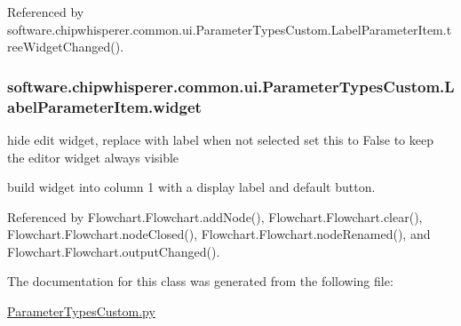 Referenced by software.\+chipwhisperer.\+common.\+ui.\+Parameter\+Types\+Custom.\+Label\+Parameter\+Item.\+tree\+Widget\+Changed().

\hypertarget{classsoftware_1_1chipwhisperer_1_1common_1_1ui_1_1ParameterTypesCustom_1_1LabelParameterItem_a314c57ec0ea8261cf90b1766d1e25bdb}{}
\subsubsection[{widget}]{\setlength{\rightskip}{0pt plus 5cm}software.\+chipwhisperer.\+common.\+ui.\+Parameter\+Types\+Custom.\+Label\+Parameter\+Item.\+widget}\label{classsoftware_1_1chipwhisperer_1_1common_1_1ui_1_1ParameterTypesCustom_1_1LabelParameterItem_a314c57ec0ea8261cf90b1766d1e25bdb}


hide edit widget, replace with label when not selected set this to False to keep the editor widget always visible 

build widget into column 1 with a display label and default button. 

Referenced by Flowchart.\+Flowchart.\+add\+Node(), Flowchart.\+Flowchart.\+clear(), Flowchart.\+Flowchart.\+node\+Closed(), Flowchart.\+Flowchart.\+node\+Renamed(), and Flowchart.\+Flowchart.\+output\+Changed().



The documentation for this class was generated from the following file\+:\begin{DoxyCompactItemize}
\item 
\hyperlink{ParameterTypesCustom_8py}{Parameter\+Types\+Custom.\+py}\end{DoxyCompactItemize}
